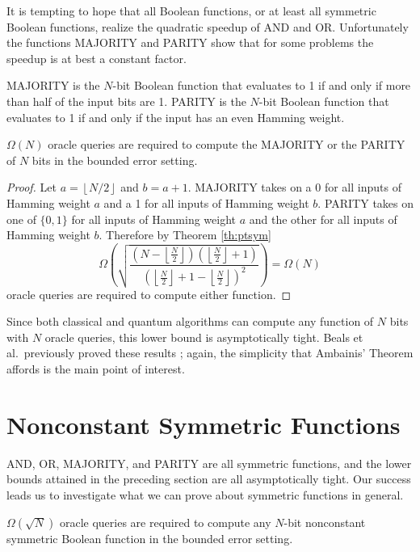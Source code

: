 It is tempting to hope that all Boolean functions, or at least all
symmetric Boolean functions, realize the quadratic speedup of AND and
OR.  Unfortunately the functions MAJORITY and PARITY show that for
some problems the speedup is at best a constant factor.

MAJORITY is the $N$-bit Boolean function that evaluates to 1 if and
only if more than half of the input bits are 1.  PARITY is the $N$-bit
Boolean function that evaluates to 1 if and only if the input has an
even Hamming weight.

\begin{theorem}
\label{th:MAJORITY}
$\Omega(N)$ oracle queries are required to compute the MAJORITY or the
PARITY of $N$ bits in the bounded error setting.
\end{theorem}

\begin{proof}
Let $a = \left\lfloor N/2 \right\rfloor$ and $b = a+1$.  MAJORITY
takes on a 0 for all inputs of Hamming weight $a$ and a 1 for all
inputs of Hamming weight $b$.  PARITY takes on one of $\{0,1\}$ for
all inputs of Hamming weight $a$ and the other for all inputs of
Hamming weight $b$.  Therefore by Theorem \ref{th:ptsym}
\[\Omega\left(\sqrt{\frac{\left(N - \left\lfloor\frac{N}{2}\right\rfloor\right)\left(\left\lfloor\frac{N}{2}\right\rfloor+1\right)}{\left(\left\lfloor\frac{N}{2}\right\rfloor+1-\left\lfloor\frac{N}{2}\right\rfloor\right)^{2}}}\right) =
\Omega\left(N\right) \]
oracle queries are required to compute either function.
\end{proof}

Since both classical and quantum algorithms can compute any function
of $N$ bits with $N$ oracle queries, this lower bound is
asymptotically tight.  Beals et al.\ previously proved these results
\cite{beals98quantum}; again, the simplicity that Ambainis' Theorem
affords is the main point of interest.

\section{Nonconstant Symmetric Functions}
\label{sec:lqbnsf}

AND, OR, MAJORITY, and PARITY are all symmetric functions, and the
lower bounds attained in the preceding section are all asymptotically
tight.  Our success leads us to investigate what we can prove about
symmetric functions in general.

\begin{theorem}
\label{th:sym}
$\Omega(\sqrt{N})$ oracle queries are required to compute any $N$-bit
nonconstant symmetric Boolean function in the bounded error setting.
\end{theorem}

